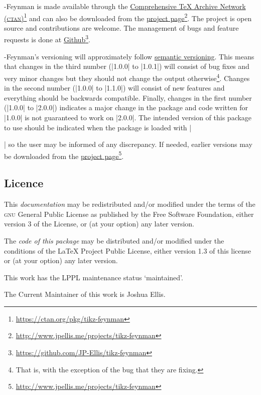 \documentclass[a4paper,final]{ltxdoc}
\providecommand{\tikzfeynmanname}{\tikzname-Feynman}
\begin{document}
\tikzfeynmanname{} is made available through the
\href{https://ctan.org/pkg/tikz-feynman}{Comprehensive \TeX{} Archive Network
  (\textsc{ctan})}\footnote{\url{https://ctan.org/pkg/tikz-feynman}} and can
also be downloaded from the
\href{http://www.jpellis.me/projects/tikz-feynman}{project
  page}\footnote{\url{http://www.jpellis.me/projects/tikz-feynman}}.  The
project is open source and contributions are welcome.  The management of bugs
and feature requests is done at
\href{https://github.com/JP-Ellis/tikz-feynman}{Github}\footnote{\url{https://github.com/JP-Ellis/tikz-feynman}}.

\tikzfeynmanname{}'s versioning will approximately follow
\href{http://semverg.org}{semantic versioning}.  This means that changes in the
third number (|1.0.0| to |1.0.1|) will consist of bug fixes and very minor
changes but they should not change the output otherwise\footnote{That is, with
  the exception of the bug that they are fixing.}.  Changes in the second number
(|1.0.0| to |1.1.0|) will consist of new features and everything should be
backwards compatible.  Finally, changes in the first number (|1.0.0| to |2.0.0|)
indicates a major change in the package and code written for |1.0.0| is not
guaranteed to work on |2.0.0|.  The intended version of this package to use
should be indicated when the package is loaded with
|\usepackage[compat=x.y.z]{tikz-feynman}| so the user may be informed of any
discrepancy.  If needed, earlier versions may be downloaded from the
\href{http://www.jpellis.me/projects/tikz-feynman}{project
  page}\footnote{\url{http://www.jpellis.me/projects/tikz-feynman}}.

\subsection*{Licence}
\label{subsec:licence}

This \emph{documentation} may be redistributed and/or modified under the terms
of the \textsc{gnu} General Public License as published by the Free Software
Foundation, either version 3 of the License, or (at your option) any later
version.

The \emph{code of this package} may be distributed and/or modified under the
conditions of the \LaTeX{} Project Public License, either version 1.3 of this
license or (at your option) any later version.

This work has the LPPL maintenance status `maintained'.

The Current Maintainer of this work is Joshua Ellis.
\end{document}
